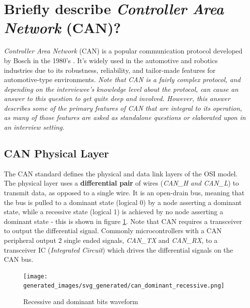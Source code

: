 \documentclass[main.tex]{subfiles}
\begin{document}
\section{Briefly describe \textit{Controller Area Network} (CAN)?}

\spoilerline
\noindent \textit{Controller Area Network} (CAN) is a popular communication protocol developed by Bosch in the 1980's \cite{cadence_canbus_history}. It's widely used in the automotive and robotics industries due to its robustness, reliability, and tailor-made features for automotive-type environments.\newline
\newnoindentpara \textit{Note that CAN is a fairly complex protocol, and depending on the interviewee's knowledge level about the protocol, can cause an answer to this question to get quite deep and involved. However, this answer describes some of the primary features of CAN that are integral to its operation, as many of those features are asked as standalone questions or elaborated upon in an interview setting.} \newline

\subsection{CAN Physical Layer}
The CAN standard defines the physical and data link layers of the OSI model. The physical layer uses a \textbf{differential pair} of wires (\textit{CAN\_H and CAN\_L}) to transmit data, as opposed to a single wire. It is an open-drain bus, meaning that the bus is pulled to a dominant state (logical 0) by a node asserting a dominant state, while a recessive state (logical 1) is achieved by no node asserting a dominant state - this is shown in figure \ref{fig:can-dominant-recessive}. Note that CAN requires a transceiver to output the differential signal. Commonly microcontrollers with a CAN peripheral output 2 single ended signals, \textit{CAN\_TX} and \textit{CAN\_RX}, to a transceiver IC (\textit{Integrated Circuit}) which drives the differential signals on the CAN bus. 

\begin{figure}[H]
    \centering
    \texttt{[image: generated\_images/svg\_generated/can\_dominant\_recessive.png]}
    \caption{Recessive and dominant bits waveform \cite{ti_can_signal_levels}}
    \label{fig:can-dominant-recessive}
\end{figure}
\end{document}
